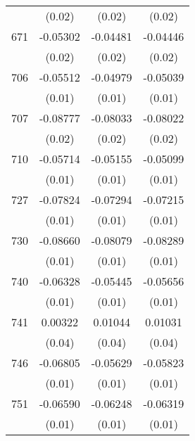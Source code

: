\begin{table}[htbp]
\begin{tabular}{l*{3}{c}}
                    &      (0.02)         &      (0.02)         &      (0.02)         \\
671                 &    -0.05302\sym{**} &    -0.04481\sym{*}  &    -0.04446\sym{*}  \\
                    &      (0.02)         &      (0.02)         &      (0.02)         \\
706                 &    -0.05512\sym{***}&    -0.04979\sym{***}&    -0.05039\sym{***}\\
                    &      (0.01)         &      (0.01)         &      (0.01)         \\
707                 &    -0.08777\sym{***}&    -0.08033\sym{***}&    -0.08022\sym{***}\\
                    &      (0.02)         &      (0.02)         &      (0.02)         \\
710                 &    -0.05714\sym{***}&    -0.05155\sym{***}&    -0.05099\sym{***}\\
                    &      (0.01)         &      (0.01)         &      (0.01)         \\
727                 &    -0.07824\sym{***}&    -0.07294\sym{***}&    -0.07215\sym{***}\\
                    &      (0.01)         &      (0.01)         &      (0.01)         \\
730                 &    -0.08660\sym{***}&    -0.08079\sym{***}&    -0.08289\sym{***}\\
                    &      (0.01)         &      (0.01)         &      (0.01)         \\
740                 &    -0.06328\sym{***}&    -0.05445\sym{***}&    -0.05656\sym{***}\\
                    &      (0.01)         &      (0.01)         &      (0.01)         \\
741                 &     0.00322         &     0.01044         &     0.01031         \\
                    &      (0.04)         &      (0.04)         &      (0.04)         \\
746                 &    -0.06805\sym{***}&    -0.05629\sym{***}&    -0.05823\sym{***}\\
                    &      (0.01)         &      (0.01)         &      (0.01)         \\
751                 &    -0.06590\sym{***}&    -0.06248\sym{***}&    -0.06319\sym{***}\\
                    &      (0.01)         &      (0.01)         &      (0.01)         \\

\end{tabular}
\end{table}
